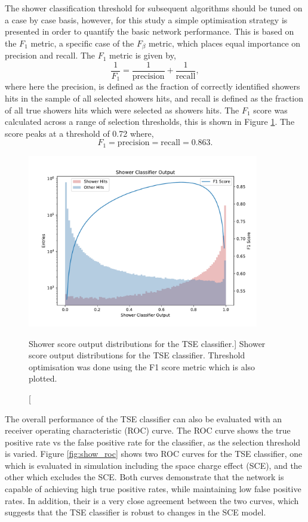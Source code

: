The shower classification threshold for subsequent algorithms should be tuned on
a case by case basis, however, for this study a simple optimisation strategy 
is presented in order to quantify the basic network performance. This is based
on the $F_1$ metric, a specific case of the $F_\beta$ 
metric\cite{VanRijsbergenC.J.1975Ir}, which places equal importance on 
precision and recall. The $F_1$ metric is given by, 
\begin{equation*}
	\frac{1}{F_1} = \frac{1}{\mbox{precision}} + \frac{1}{\mbox{recall}},
\end{equation*}
where here the precision, is defined as the fraction of correctly identified 
showers hits in the sample of all selected showers hits, and recall is defined 
as the fraction of all true showers hits which were selected as showers hits. 
The $F_1$ score was calculated across a range of selection thresholds, this is 
shown in Figure \ref{fig:show_output}. The score peaks at a threshold of 0.72 
where,
\begin{equation*}
	F_1 = \mbox{precision} = \mbox{recall} = 0.863.
\end{equation*}

\begin{figure}
	\centering
	\includegraphics[width=0.9\textwidth]{figures/shower_combined.pdf} 
	\caption
	[Shower score output distributions for the TSE classifier.]
	{Shower score output distributions for the TSE classifier. Threshold 
	optimisation was done using the F1 score metric which is also plotted.}
	\label{fig:show_output}
\end{figure}

The overall performance of the TSE classifier can also be evaluated with an
receiver operating characteristic (ROC) curve\cite{Fawcett2006}. The ROC curve
shows the true positive rate vs the false positive rate for the classifier, as
the selection threshold is varied. Figure \ref{fig:show_roc} shows two ROC
curves for the TSE classifier, one which is evaluated in simulation including
the space charge effect (SCE), and the other which excludes the SCE. Both curves
demonstrate that the network is capable of achieving high true positive rates,
while maintaining low false positive rates. In addition, their is a very close
agreement between the two curves, which suggests that the TSE classifier is
robust to changes in the SCE model.


